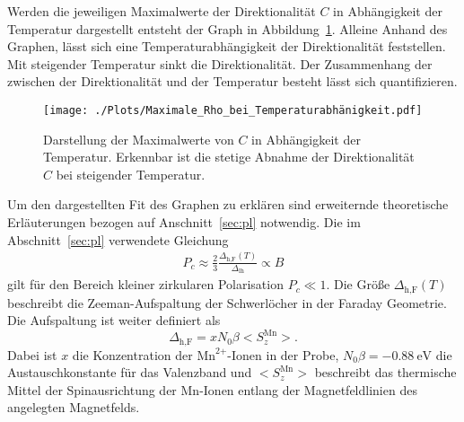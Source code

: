 Werden die jeweiligen Maximalwerte der Direktionalität $C$ in Abhängigkeit
der Temperatur dargestellt entsteht der Graph in Abbildung~\ref{fig:fit}.
Alleine Anhand des Graphen, lässt sich eine Temperaturabhängigkeit der Direktionalität
feststellen.
Mit steigender Temperatur sinkt die Direktionalität.
Der Zusammenhang der zwischen der Direktionalität und der Temperatur besteht lässt sich 
quantifizieren.
\begin{figure}
    \centering
    \texttt{[image: ./Plots/Maximale\_Rho\_bei\_Temperaturabhänigkeit.pdf]}
    \caption{Darstellung der Maximalwerte von $C$ in Abhängigkeit der Temperatur.
    Erkennbar ist die stetige Abnahme der Direktionalität $C$ bei steigender Temperatur.}
    \label{fig:fit}
\end{figure}
\FloatBarrier

Um den dargestellten Fit des Graphen zu erklären
sind erweiternde theoretische Erläuterungen bezogen auf Anschnitt~\ref{sec:pl} notwendig.
Die im Abschnitt~\ref{sec:pl} verwendete Gleichung 
\begin{align*}
    P_c \approx \frac{2}{3} \frac{\Delta_\text{h,F}(T)}{\Delta_\text{lh}} \propto B
\end{align*}
gilt für den Bereich kleiner zirkularen Polarisation $P_{c}\ll 1$. 
Die Größe $\Delta_\text{h,F}(T)$ beschreibt die 
Zeeman-Aufspaltung der Schwerlöcher in der Faraday Geometrie.
Die Aufspaltung ist weiter definiert als 
\begin{equation}
    \Delta_\text{h,F} = xN_0\beta \bigl< S^\text{Mn}_{z} \bigr>.
\end{equation}
Dabei ist $x$ die Konzentration der $\text{Mn}^\text{2+}\text{-Ionen}$ in der Probe,
$N_0\beta = -\SI{0.88}{\eV}$ die Austauschkonstante für das Valenzband und 
$\bigl< S^\text{Mn}_{z} \bigr>$ beschreibt das thermische Mittel der Spinausrichtung
der Mn-Ionen entlang der Magnetfeldlinien des angelegten Magnetfelds.

